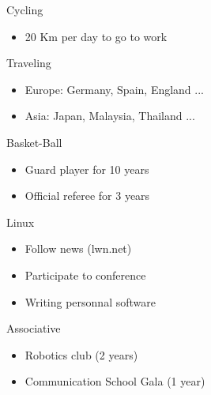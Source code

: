 \documentclass[letterpaper]{jm-cv} %
\begin{document}

\vspace{-0.2cm}

\begin{multicols}{2}
  \small {

    {\color{mainblue}\faBicycle} Cycling
    {\footnotesize
      \vspace{-0.2cm}
      \begin{itemize}
      \item[\color{maingray}\faArrowRight] 20 Km per day to go to work
      \end{itemize}
    }

    {\color{mainblue}\faUser} Traveling
        {\footnotesize
      \vspace{-0.2cm}
      \begin{itemize}
      \item[\color{maingray}\faArrowRight] Europe: Germany, Spain, England ...
      \item[\color{maingray}\faArrowRight] Asia: Japan, Malaysia, Thailand ...
      \end{itemize}
    }

    {\color{mainblue}\faDribbble} Basket-Ball
    {\footnotesize
      \vspace{-0.2cm}
      \begin{itemize}
      \item[\color{maingray}\faArrowRight] Guard player for 10 years
      \item[\color{maingray}\faArrowRight] Official referee for 3 years
      \end{itemize}
    }

    {\color{mainblue}\faLinux} Linux
    {\footnotesize
      \vspace{-0.2cm}
      \begin{itemize}
      \item[\color{maingray}\faArrowRight] Follow news (lwn.net)
      \item[\color{maingray}\faArrowRight] Participate to conference
      \item[\color{maingray}\faArrowRight] Writing personnal software
      \end{itemize}
    }

    {\color{mainblue}\faCogs} Associative
    {\footnotesize
      \vspace{-0.2cm}
      \begin{itemize}
      \item[\color{maingray}\faArrowRight] Robotics club (2 years)
      \item[\color{maingray}\faArrowRight] Communication School Gala (1 year)
      \end{itemize}
    }

  }

\end{multicols}
\end{document}
